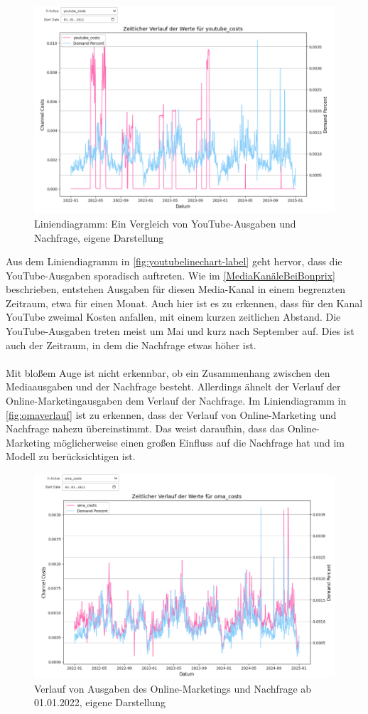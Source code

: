 \begin{figure}[ht]
    \centering
    \includegraphics[width=0.98\linewidth]{images/youtubeLineChart.png}
    \caption{Liniendiagramm: Ein Vergleich von YouTube-Ausgaben und Nachfrage, eigene Darstellung}
    \label{fig:youtubelinechart-label}
\end{figure}
Aus dem Liniendiagramm in \autoref{fig:youtubelinechart-label} geht hervor, dass die YouTube-Ausgaben sporadisch auftreten. Wie im \autoref{MediaKanäleBeiBonprix} beschrieben, entstehen Ausgaben für diesen Media-Kanal in einem begrenzten Zeitraum, etwa für einen Monat. Auch hier ist es zu erkennen, dass für den Kanal YouTube zweimal Kosten anfallen, mit einem kurzen zeitlichen Abstand. Die YouTube-Ausgaben treten meist um Mai und kurz nach September auf. Dies ist auch der Zeitraum, in dem die Nachfrage etwas höher ist. \\\\
Mit bloßem Auge ist nicht erkennbar, ob ein Zusammenhang zwischen den Mediaausgaben und der Nachfrage besteht. Allerdings ähnelt der Verlauf der Online-Marketingausgaben dem Verlauf der Nachfrage. Im Liniendiagramm in \autoref{fig:omaverlauf} ist zu erkennen, dass der Verlauf von Online-Marketing und Nachfrage nahezu übereinstimmt. Das weist daraufhin, dass das Online-Marketing möglicherweise einen großen Einfluss auf die Nachfrage hat und im Modell zu berücksichtigen ist.
\begin{figure}[H]
    \centering
    \includegraphics[width=0.8\linewidth]{images/omacosts.png}
    \caption{Verlauf von Ausgaben des Online-Marketings und Nachfrage ab 01.01.2022, eigene Darstellung}
    \label{fig:omaverlauf}
\end{figure}
